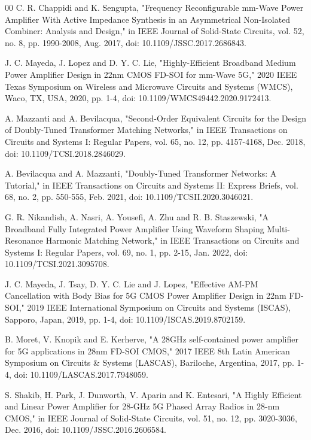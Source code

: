 \documentclass{IEEEtran}
\begin{document}
\begin{thebibliography}{00}
C. R. Chappidi and K. Sengupta, "Frequency Reconfigurable mm-Wave Power Amplifier With Active Impedance Synthesis in an Asymmetrical Non-Isolated Combiner: Analysis and Design," in IEEE Journal of Solid-State Circuits, vol. 52, no. 8, pp. 1990-2008, Aug. 2017, doi: 10.1109/JSSC.2017.2686843.


J. C. Mayeda, J. Lopez and D. Y. C. Lie, "Highly-Efficient Broadband Medium Power Amplifier Design in 22nm CMOS FD-SOI for mm-Wave 5G," 2020 IEEE Texas Symposium on Wireless and Microwave Circuits and Systems (WMCS), Waco, TX, USA, 2020, pp. 1-4, doi: 10.1109/WMCS49442.2020.9172413.




A. Mazzanti and A. Bevilacqua, "Second-Order Equivalent Circuits for the Design of Doubly-Tuned Transformer Matching Networks," in IEEE Transactions on Circuits and Systems I: Regular Papers, vol. 65, no. 12, pp. 4157-4168, Dec. 2018, doi: 10.1109/TCSI.2018.2846029.

A. Bevilacqua and A. Mazzanti, "Doubly-Tuned Transformer Networks: A Tutorial," in IEEE Transactions on Circuits and Systems II: Express Briefs, vol. 68, no. 2, pp. 550-555, Feb. 2021, doi: 10.1109/TCSII.2020.3046021.


G. R. Nikandish, A. Nasri, A. Yousefi, A. Zhu and R. B. Staszewski, "A Broadband Fully Integrated Power Amplifier Using Waveform Shaping Multi-Resonance Harmonic Matching Network," in IEEE Transactions on Circuits and Systems I: Regular Papers, vol. 69, no. 1, pp. 2-15, Jan. 2022, doi: 10.1109/TCSI.2021.3095708.


J. C. Mayeda, J. Tsay, D. Y. C. Lie and J. Lopez, "Effective AM-PM Cancellation with Body Bias for 5G CMOS Power Amplifier Design in 22nm FD-SOI," 2019 IEEE International Symposium on Circuits and Systems (ISCAS), Sapporo, Japan, 2019, pp. 1-4, doi: 10.1109/ISCAS.2019.8702159.

B. Moret, V. Knopik and E. Kerherve, "A 28GHz self-contained power amplifier for 5G applications in 28nm FD-SOI CMOS," 2017 IEEE 8th Latin American Symposium on Circuits \& Systems (LASCAS), Bariloche, Argentina, 2017, pp. 1-4, doi: 10.1109/LASCAS.2017.7948059.


S. Shakib, H. Park, J. Dunworth, V. Aparin and K. Entesari, "A Highly Efficient and Linear Power Amplifier for 28-GHz 5G Phased Array Radios in 28-nm CMOS," in IEEE Journal of Solid-State Circuits, vol. 51, no. 12, pp. 3020-3036, Dec. 2016, doi: 10.1109/JSSC.2016.2606584.





\end{thebibliography}
\end{document}
